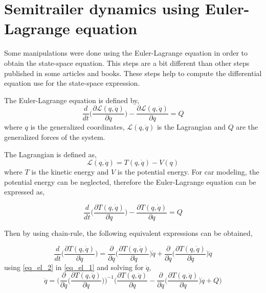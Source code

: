 \documentclass[12pt]{article}
\begin{document}
\section{Semitrailer dynamics using Euler-Lagrange equation}
Some manipulations were done using the Euler-Lagrange equation in order to obtain the state-space equation. This steps are a bit different than other steps published in some articles and books. These steps help to compute the differential equation use for the state-space expression.

The Euler-Lagrange equation is defined by,
\begin{equation}
    \frac{d}{dt} \Big( \frac{\partial \mathcal{L}(q,\dot{q})}{\partial \dot{q}} \Big) - \frac{\partial \mathcal{L}(q,\dot{q})}{\partial q} = Q
\end{equation}
where $q$ is the generalized coordinates, $\mathcal{L} (q,\dot{q})$ is the Lagrangian and $Q$ are the generalized forces of the system.

The Lagrangian is defined as,
\begin{equation}
\mathcal{L} (q,\dot{q}) = T(q,\dot{q}) - V(q)    
\end{equation}
where $T$ is the kinetic energy and $V$ is the potential energy. For car modeling, the potential energy can be neglected, therefore the Euler-Lagrange equation can be expressed as,

\begin{equation} \label{eq_el_1}
    \frac{d}{dt} \Big( \frac{\partial T(q,\dot{q}) }{\partial \dot{q}} \Big) - \frac{\partial T(q,\dot{q}) }{\partial q} = Q
\end{equation}

Then by using chain-rule, the following equivalent expressions can be obtained,

\begin{equation}
\label{eq_el_2}
  \frac{d}{dt} \Big( \frac{\partial T(q,\dot{q}) }{\partial \dot{q}} \Big) = \frac{\partial }{\partial q} \Big( \frac{\partial T(q,\dot{q})}{\partial \dot{q}} \Big) \dot{q} + \frac{\partial }{\partial \dot{q}} \Big( \frac{\partial T(q,\dot{q})}{\partial \dot{q}} \Big) \ddot{q}  
\end{equation}
using \eqref{eq_el_2} in \eqref{eq_el_1} and solving for $\ddot{q}$,
\begin{equation}
    \ddot{q} =  \Bigg(  \frac{\partial }{\partial \dot{q}} \Big( \frac{\partial T(q,\dot{q})}{\partial \dot{q}} \Big) \Bigg)^{-1} \Bigg( \frac{ \partial T(q,\dot{q})}{\partial q} - \frac{\partial }{\partial q} \Big( \frac{\partial T(q,\dot{q})}{\partial \dot{q}} \Big) \dot{q} + Q \Bigg)
\end{equation}
\end{document}
